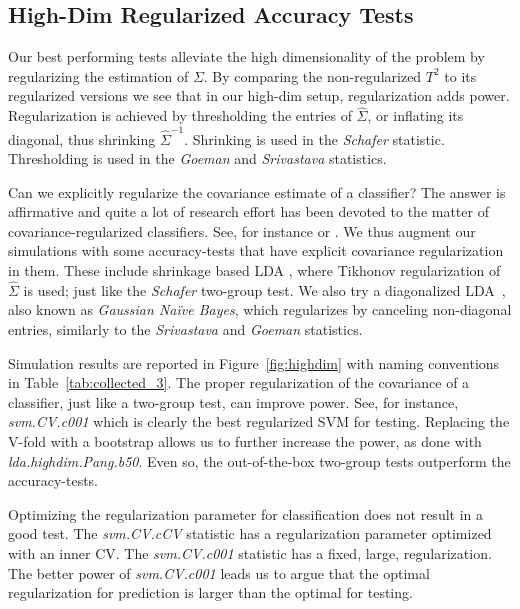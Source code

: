 \documentclass[oupdraft]{bio}
\begin{document}
\subsection{High-Dim Regularized Accuracy Tests}
\label{sec:highdim}

Our best performing tests alleviate the high dimensionality of the problem by regularizing the estimation of $\Sigma$. 
By comparing the non-regularized $T^2$ to its regularized versions we see that in our high-dim setup, regularization adds power. 
Regularization is achieved by thresholding the entries of $\hat{\Sigma}$, or inflating its diagonal, thus shrinking $\hat \Sigma^{-1}$. 
Shrinking is used in the \emph{Schafer} statistic.
Thresholding is used in the \emph{Goeman} and \emph{Srivastava} statistics.

Can we explicitly regularize the covariance estimate of a classifier?
The answer is affirmative and quite a lot of research effort has been devoted to the matter of covariance-regularized classifiers. 
See, for instance \cite{bickel2004some} or \cite{dobriban2018high}.
We thus augment our simulations with some accuracy-tests that have explicit covariance regularization in them. 
These include shrinkage based LDA \citep{pang_shrinkage-based_2009,ramey_high-dimensional_2016}, where Tikhonov regularization of $\hat \Sigma$ is used; just like the \emph{Schafer} two-group test.
We also try a diagonalized LDA~\citep{dudoit_comparison_2002}, also known as \emph{Gaussian Na\"ive Bayes}, which regularizes by canceling non-diagonal entries, similarly to the \emph{Srivastava} and \emph{Goeman} statistics.

Simulation results are reported in Figure~\ref{fig:highdim} with naming conventions in Table~\ref{tab:collected_3}.
The proper regularization of the covariance of a classifier, just like a two-group test, can improve power. 
See, for instance, \emph{svm.CV.c001} which is clearly the best regularized SVM for testing. 
Replacing the V-fold  with a bootstrap allows us to further increase the power, as done with \emph{lda.highdim.Pang.b50}.
Even so, the out-of-the-box two-group tests outperform the accuracy-tests.

Optimizing the regularization parameter for classification does not result in a good test.
The \emph{svm.CV.cCV} statistic has a regularization parameter optimized with an inner CV. 
The \emph{svm.CV.c001} statistic has a fixed, large, regularization.
The better power of \emph{svm.CV.c001} leads us to argue that the optimal regularization for prediction is larger than the optimal for testing.
\end{document}
